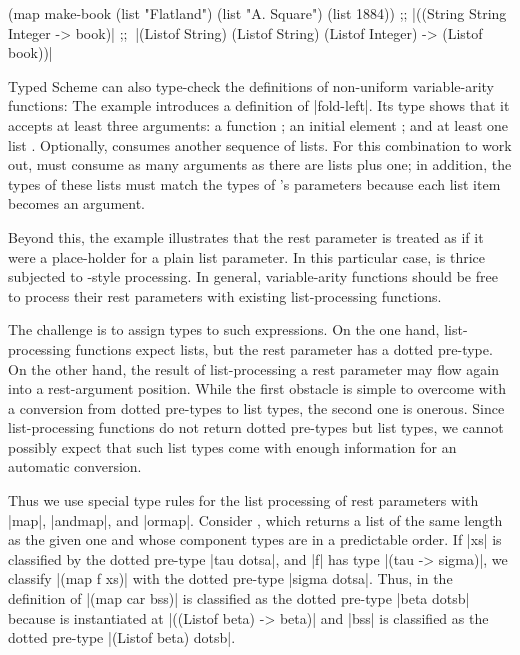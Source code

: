 \begin{schemeregion}
\begin{schemedisplay}
(map make-book (list "Flatland") (list "A. Square") (list 1884))
;; \scheme|((String String Integer -> book)|
;; $\ $\scheme|(Listof String) (Listof String) (Listof Integer) -> (Listof book))|
\end{schemedisplay}

Typed Scheme can also type-check the definitions of non-uniform
variable-arity functions: 
The example introduces a definition of
 \scheme|fold-left|. Its type shows that it accepts at least three arguments: a
 function ; an initial element ;
 and at least one list . Optionally,
  consumes another sequence  of lists. For
 this combination to work out,  must consume as many arguments as
 there are lists plus one; in addition, the types of these lists must match
 the types of 's parameters because each list item 
 becomes an argument. 

Beyond this, the example illustrates that the rest parameter is treated as
 if it were a place-holder for a plain list parameter. In this particular
 case,  is thrice subjected to -style processing.
 In general, variable-arity functions should be free to process their rest
 parameters with existing list-processing functions. 

The challenge is to assign types to such expressions. On the one hand,
 list-processing functions expect lists, but the rest parameter has a
 dotted pre-type. On the other hand, the result of list-processing a rest
 parameter may flow again into a rest-argument position. While the first
 obstacle is simple to overcome with a conversion from dotted
 pre-types to list types, the second one is onerous. Since
 list-processing functions do not return dotted pre-types but list types,
 we cannot possibly expect that such list types come with enough
 information for an automatic conversion. 

Thus we use special type rules for the list
processing of rest parameters with \scheme|map|, \scheme|andmap|, and
\scheme|ormap|.  Consider , which returns a list of the
 same length as the given one and whose component types are in a predictable
 order.  If \scheme|xs| is classified by the dotted pre-type
 \scheme|tau dotsa|, and \scheme|f| has type \scheme|(tau -> sigma)|, we classify
 \scheme|(map f xs)| with the dotted pre-type \scheme|sigma dotsa|.
 Thus, in the definition of  \scheme|(map car bss)|
 is classified as the dotted pre-type \scheme|beta dotsb| because
  is instantiated at \scheme|((Listof beta) -> beta)| and
 \scheme|bss| is classified as the dotted pre-type \scheme|(Listof beta)
 dotsb|.


\end{schemeregion}
